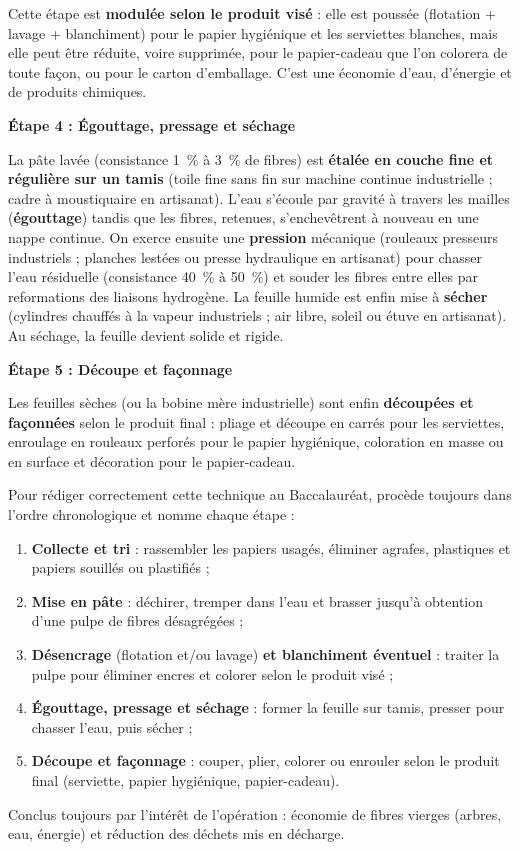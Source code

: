 \documentclass[11pt]{article}
\begin{document}
Cette étape est \textbf{modulée selon le produit visé} : elle est poussée (flotation + lavage + blanchiment) pour le papier hygiénique et les serviettes blanches, mais elle peut être réduite, voire supprimée, pour le papier-cadeau que l'on colorera de toute façon, ou pour le carton d'emballage. C'est une économie d'eau, d'énergie et de produits chimiques.

\textbf{Étape 4 : Égouttage, pressage et séchage}\par
La pâte lavée (consistance \SI{1}{\%} à \SI{3}{\%} de fibres) est \textbf{étalée en couche fine et régulière sur un tamis} (toile fine sans fin sur machine continue industrielle ; cadre à moustiquaire en artisanat). L'eau s'écoule par gravité à travers les mailles (\textbf{égouttage}) tandis que les fibres, retenues, s'enchevêtrent à nouveau en une nappe continue. On exerce ensuite une \textbf{pression} mécanique (rouleaux presseurs industriels ; planches lestées ou presse hydraulique en artisanat) pour chasser l'eau résiduelle (consistance \SI{40}{\%} à \SI{50}{\%}) et souder les fibres entre elles par reformations des liaisons hydrogène. La feuille humide est enfin mise à \textbf{sécher} (cylindres chauffés à la vapeur industriels ; air libre, soleil ou étuve en artisanat). Au séchage, la feuille devient solide et rigide.

\textbf{Étape 5 : Découpe et façonnage}\par
Les feuilles sèches (ou la bobine mère industrielle) sont enfin \textbf{découpées et façonnées} selon le produit final : pliage et découpe en carrés pour les serviettes, enroulage en rouleaux perforés pour le papier hygiénique, coloration en masse ou en surface et décoration pour le papier-cadeau.

\begin{methode}
Pour rédiger correctement cette technique au Baccalauréat, procède toujours dans l'ordre chronologique et nomme chaque étape :
\begin{enumerate}
\item \textbf{Collecte et tri} : rassembler les papiers usagés, éliminer agrafes, plastiques et papiers souillés ou plastifiés ;
\item \textbf{Mise en pâte} : déchirer, tremper dans l'eau et brasser jusqu'à obtention d'une pulpe de fibres désagrégées ;
\item \textbf{Désencrage} (flotation et/ou lavage) \textbf{et blanchiment éventuel} : traiter la pulpe pour éliminer encres et colorer selon le produit visé ;
\item \textbf{Égouttage, pressage et séchage} : former la feuille sur tamis, presser pour chasser l'eau, puis sécher ;
\item \textbf{Découpe et façonnage} : couper, plier, colorer ou enrouler selon le produit final (serviette, papier hygiénique, papier-cadeau).
\end{enumerate}
Conclus toujours par l'intérêt de l'opération : économie de fibres vierges (arbres, eau, énergie) et réduction des déchets mis en décharge.
\end{methode}
\end{document}
